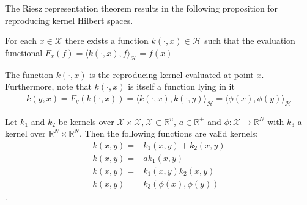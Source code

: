 


The Riesz representation theorem results in the following proposition for reproducing kernel Hilbert spaces.
\begin{proposition}
For each $x \in \mathcal{X}$ there exists a function $k(\cdot, x) \in \mathcal{H}$ such that the evaluation functional $F_{x}(f)=\langle k(\cdot, x), f\rangle_{\mathcal{H}}=f(x)$    
\end{proposition}

The function $k(\cdot, x)$ is the reproducing kernel evaluated at point $x$.
Furthermore, note that $k(\cdot, x)$ is itself a function lying in it
\begin{align*}
    k(y, x)=F_{y}(k(\cdot, x))=\langle k(\cdot, x), k(\cdot, y)\rangle_{\mathcal{H}}=\langle \phi(x), \phi(y)\rangle_{\mathcal{H}}
\end{align*}



\begin{proposition}
    Let $k_1$ and $k_2$ be kernels over $\mathcal{X} \times \mathcal{X}, \mathcal{X} \subset \mathbb{R}^n$, $a \in \mathbb{R}^+$ and $\phi: \mathcal{X} \to \mathbb{R}^N$ with $k_3$ a kernel over $\mathbb{R}^N \times \mathbb{R}^N$. Then the following functions are valid kernels:
    $$
    \begin{aligned}
        k(x,y)=&k_1(x,y)+k_2(x,y)
        \\
        k(x,y)=& ak_1(x,y)
        \\
        k(x,y)=& k_1(x,y)k_2(x,y)
        \\
        k(x,y)=& k_3(\phi(x),\phi(y))
    \end{aligned}
    $$.
\end{proposition}


